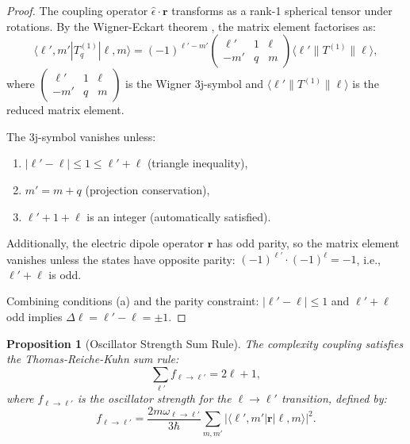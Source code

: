 \documentclass[twocolumn,10pt,a4paper]{article}
\newtheorem{proposition}[theorem]{Proposition}
\theoremstyle{remark}
\begin{document}
\begin{proof}
The coupling operator $\hat{\epsilon} \cdot \mathbf{r}$ transforms as a rank-1 spherical tensor under rotations. By the Wigner-Eckart theorem \citep{Wigner1931}, the matrix element factorises as:
\begin{equation}
\langle \ell', m' | T^{(1)}_q | \ell, m \rangle = (-1)^{\ell'-m'} \begin{pmatrix} \ell' & 1 & \ell \\ -m' & q & m \end{pmatrix} \langle \ell' \| T^{(1)} \| \ell \rangle,
\end{equation}
where $\begin{pmatrix} \ell' & 1 & \ell \\ -m' & q & m \end{pmatrix}$ is the Wigner 3j-symbol and $\langle \ell' \| T^{(1)} \| \ell \rangle$ is the reduced matrix element.

The 3j-symbol vanishes unless:
\begin{enumerate}[label=(\alph*), noitemsep]
    \item $|\ell' - \ell| \leq 1 \leq \ell' + \ell$ (triangle inequality),
    \item $m' = m + q$ (projection conservation),
    \item $\ell' + 1 + \ell$ is an integer (automatically satisfied).
\end{enumerate}

Additionally, the electric dipole operator $\mathbf{r}$ has odd parity, so the matrix element vanishes unless the states have opposite parity: $(-1)^{\ell'} \cdot (-1)^{\ell} = -1$, i.e., $\ell' + \ell$ is odd.

Combining conditions (a) and the parity constraint: $|\ell' - \ell| \leq 1$ and $\ell' + \ell$ odd implies $\Delta \ell = \ell' - \ell = \pm 1$.
\end{proof}

\begin{proposition}[Oscillator Strength Sum Rule]
\label{prop:oscillator_strength}
The complexity coupling satisfies the Thomas-Reiche-Kuhn sum rule:
\begin{equation}
\sum_{\ell'} f_{\ell \to \ell'} = 2\ell + 1,
\end{equation}
where $f_{\ell \to \ell'}$ is the oscillator strength for the $\ell \to \ell'$ transition, defined by:
\begin{equation}
f_{\ell \to \ell'} = \frac{2m\omega_{\ell \to \ell'}}{3\hbar} \sum_{m, m'} \left|\langle \ell', m' | \mathbf{r} | \ell, m \rangle\right|^2.
\end{equation}
\end{proposition}
\end{document}
